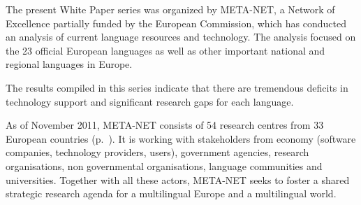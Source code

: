 \begin{Parallel}[c]{78mm}{78mm}
{The present White Paper series was organized by META-NET, a Network of Excellence partially funded by the European Commission, 
which has conducted an  analysis of current language resources and technology. 
The analysis focused on the 23 official European languages as well as other important national and regional languages in Europe. 

The results compiled in this series indicate that there are tremendous deficits in technology support and significant research gaps for each language.

As of November 2011, META-NET consists of 54 research centres from 33 European countries (p.~\pageref{metanetmembers}). It is working with stakeholders from economy (software companies, technology providers, users), government agencies, research organisations, non governmental organisations, language communities and universities. Together with all these actors, META-NET seeks to foster a shared strategic research agenda for a multilingual Europe and a multilingual world.} 
\ParallelPar
\end{Parallel}

\makefundingnotice


\cleardoublepage


\tableofcontents



\cleardoublepage

\setcounter{page}{1}
\pagestyle{scrheadings}




